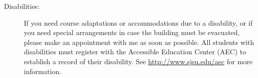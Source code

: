 \documentclass[letterpaper,12pt,fleqn]{article}
\begin{document}
\begin{description}
\item[Disabilities:] If you need course adaptations or accommodations due to a
    disability, or if you need special arrangements in case the building must
    be evacuated, please make an appointment with me as soon as possible. All
    students with disabilities must register with the Accessible Education
    Center (AEC) to establish a record of their disability. See
    \url{http://www.sjsu.edu/aec} for more information.

\end{description}
\end{document}

